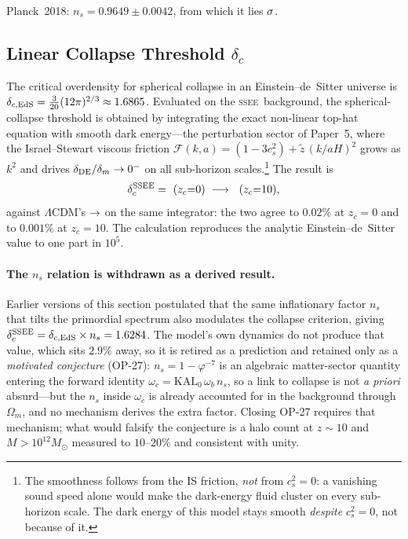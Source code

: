 \documentclass[12pt,a4paper]{article}
\newcommand{\SSEE}{\ifmmode\mathrm{SSEE}\else\textsc{ssee}\fi}
\begin{document}
Planck~2018: $n_s = 0.9649\pm0.0042$, from which it lies $\val{ns_planck_sig}\sigma$.

\subsection{Linear Collapse Threshold $\delta_c$}
\label{sec:deltac}

The critical overdensity for spherical collapse in an Einstein--de~Sitter universe is
$\delta_{c,\rm EdS} = \tfrac{3}{20}(12\pi)^{2/3} \approx 1.6865$.
Evaluated on the \SSEE\ background, the spherical-collapse threshold is
obtained by integrating the exact non-linear top-hat equation with smooth dark
energy---the perturbation sector of Paper~5, where the Israel--Stewart viscous
friction $\mathcal{F}(k,a) = (1-3c_s^2) + \tilde z\,(k/aH)^2$ grows as $k^2$ and
drives $\delta_{\rm DE}/\delta_m \to 0^-$ on all sub-horizon
scales.\footnote{The smoothness follows from the IS friction, \emph{not} from
$c_s^2=0$: a vanishing sound speed alone would make the dark-energy fluid
cluster on every sub-horizon scale. The dark energy of this model stays smooth
\emph{despite} $c_s^2=0$, not because of it.}
The result is
\begin{equation}
\delta_c^{\rm SSEE} = \val{deltac_ssee_zc0}\ (z_c{=}0) \;\longrightarrow\; \val{deltac_ssee_zc10}\ (z_c{=}10),
\label{eq:deltac}
\end{equation}
against $\Lambda$CDM's $\val{deltac_lcdm_zc0} \to \val{deltac_lcdm_zc10}$ on the same integrator: the two
agree to $0.02\%$ at $z_c=0$ and to $0.001\%$ at $z_c=10$. The calculation
reproduces the analytic Einstein--de~Sitter value to one part in $10^{5}$.

\paragraph{The $n_s$ relation is withdrawn as a derived result.}
Earlier versions of this section postulated that the same inflationary factor
$n_s$ that tilts the primordial spectrum also modulates the collapse criterion,
giving $\delta_c^{\rm SSEE} = \delta_{c,\rm EdS}\times n_s = 1.6284$. The
model's own dynamics do not produce that value, which sits $2.9\%$ away, so it
is retired as a prediction and retained only as a \emph{motivated conjecture}
(OP-27): $n_s = 1-\varphi^{-7}$ is an algebraic matter-sector quantity entering
the forward identity $\omega_c = \mathrm{KAL}_0\,\omega_b\,n_s$, so a link to
collapse is not \emph{a priori} absurd---but the $n_s$ inside $\omega_c$ is
already accounted for in the background through $\Omega_m$, and no mechanism
derives the extra factor. Closing OP-27 requires that mechanism; what would
falsify the conjecture is a halo count at $z\sim10$ and $M>10^{12}M_\odot$
measured to $10$--$20\%$ and consistent with unity.
\end{document}

